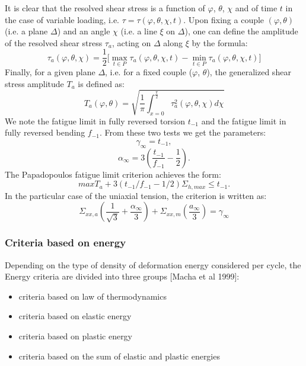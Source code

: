 \documentclass[3p,times,procedia,number]{elsarticle}
\begin{document}
         It is clear that the resolved shear stress is a function of
         $\varphi$, $\theta$, $\chi$ and of time $t$ in the case of variable loading, i.e. $\tau=\tau(\varphi, \theta, \chi, t)$. Upon fixing a couple $(\varphi, \theta)$ (i.e. a plane
         $\Delta$) and an angle $\chi$ (i.e. a line $\xi$ on $\Delta$), one can define the amplitude of the resolved shear stress $\tau_a$, acting on $\Delta$
         along $\xi$ by the formula:
         \begin{equation}
         	\tau_a(\varphi,\theta,\chi)=\frac{1}{2}\big[\max \limits_{t\in P}\tau_a(\varphi,\theta,\chi ,t)-\min \limits_{t\in P}\tau_a(\varphi,\theta,\chi ,t)\big]
         \end{equation}
         Finally, for a given plane $\Delta$, i.e. for a fixed couple ($\varphi$, $\theta$),
         the generalized shear stress amplitude $T_a$ is defined as:
         \begin{equation}
         	T_a(\varphi,\theta)=\sqrt{\frac{1}{\pi}\int_{x=0}^{\frac{\pi}{2}} \tau_a^2(\varphi,\theta,\chi)d\chi}
         	\label{Ta}
         \end{equation}
         We note the fatigue limit in fully reversed torsion $t_{-1}$ and the fatigue limit in fully reversed bending $f_{-1}$. From these two tests we get the parameters:
         $$\gamma_\infty=t_{-1},$$ 
         $$\alpha_\infty=3\left( \frac{t_{-1}}{f_{-1}}-\frac{1}{2}\right) .$$
         The Papadopoulos fatigue limit criterion achieves the form:
         \begin{equation}
         	maxT_a+3\left( t_{-1}/f_{-1}-1/2\right) \Sigma_{h,max}\leqslant t_{-1}.
         	\label{eq:papadopoulos}
         \end{equation}
         In the particular case of the uniaxial tension, the criterion is written as:
         $$\Sigma_{xx,a}\left(\dfrac{1}{\sqrt{3}}+\dfrac{\alpha_\infty}{3} \right)+\Sigma_{xx,m}\left(\dfrac{a_\infty}{3} \right) =\gamma_\infty$$
         
\subsubsection{Criteria based on energy}
Depending on the type of density of deformation energy considered per cycle, the
Energy criteria are divided into three groups [Macha et al 1999]:
\begin{itemize}
	\item  criteria based on law of thermodynamics
	\item  criteria based on elastic energy
	\item  criteria based on plastic energy
	\item  criteria based on the sum of elastic and plastic energies
\end{itemize}
\end{document}
